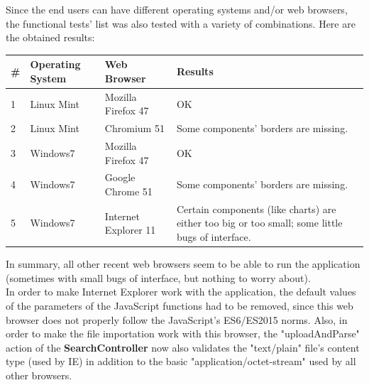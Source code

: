 \documentclass[a4paper,11pt]{report}
\begin{document}
Since the end users can have different operating systems and/or web browsers, the functional tests' list was also tested with a variety of combinations. Here are the obtained results:
\begin{center}
\def\arraystretch{1.5}
\begin{longtable}{|l|l|l|p{7cm}|}\hline
	\textbf{\#} & \textbf{Operating System} & \textbf{Web Browser} & \textbf{Results}\\\hline \endhead
	1 & Linux Mint & Mozilla Firefox 47 & \color{ForestGreen}OK\color{black}\\\hline
	2 & Linux Mint & Chromium 51 & \color{ForestGreen}Some components' borders are missing.\color{black}\\\hline
	3 & Windows7 & Mozilla Firefox 47 & \color{ForestGreen}OK\color{black}\\\hline
	4 & Windows7 & Google Chrome 51 & \color{ForestGreen}Some components' borders are missing.\color{black}\\\hline
	5 & Windows7 & Internet Explorer 11 & \color{ForestGreen}Certain components (like charts) are either too big or too small; some little bugs of interface.\color{black}\\\hline	
\end{longtable}
\end{center}
\vspace{-20pt}

In summary, all other recent web browsers seem to be able to run the application (sometimes with small bugs of interface, but nothing to worry about).\\

In order to make Internet Explorer work with the application, the default values of the parameters of the JavaScript functions had to be removed, since this web browser does not properly follow the JavaScript's ES6/ES2015 norms. Also, in order to make the file importation work with this browser, the "uploadAndParse" action of the \textbf{SearchController} now also validates the "text/plain" file's content type (used by IE) in addition to the basic "application/octet-stream" used by all other browsers.
\newpage
\end{document}
